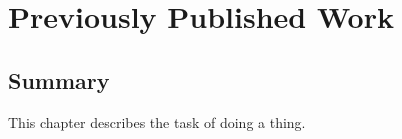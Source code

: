 \chapter{Previously Published Work}
\label{chapt:pub1}


%


%

\section{Summary}

This chapter describes the task of doing a thing.
